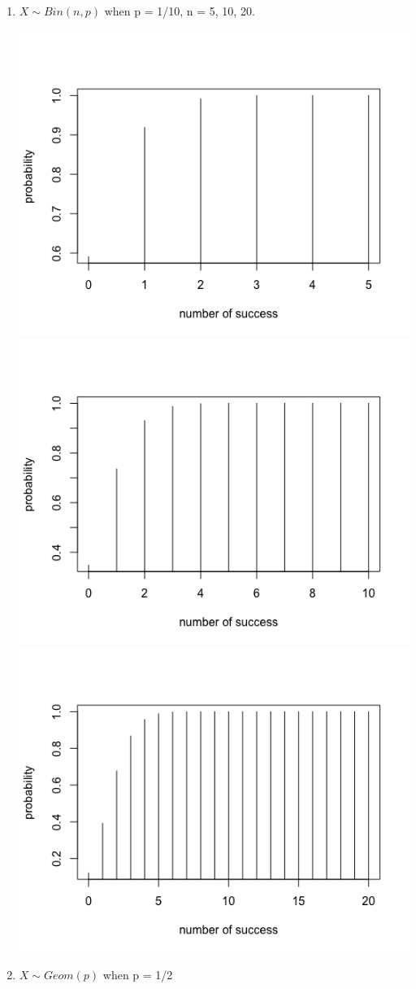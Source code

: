 \documentclass[11pt, oneside]{article}
\begin{document}
\begin{enumerate}
\begin{enumerate}
        \item $X \sim Bin(n, p)$ when p = 1/10, n = 5, 10, 20.
        
        \includegraphics[scale=0.3]{221}
        \includegraphics[scale=0.3]{222}
        \includegraphics[scale=0.3]{223}
        \item $X \sim Geom(p)$ when p = 1/2
        

\end{enumerate}
\end{enumerate}
\end{document}
